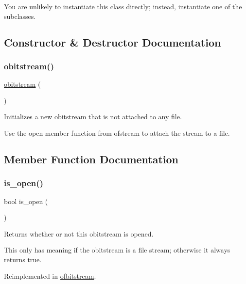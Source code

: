 You are unlikely to instantiate this class directly; instead, instantiate one of the subclasses. 

\subsection{Constructor \& Destructor Documentation}
\mbox{\label{classobitstream_affc1b0bda48ee1c09b796e92ad7f8954}} 
\subsubsection{\texorpdfstring{obitstream()}{obitstream()}}
{\footnotesize\ttfamily \mbox{\hyperlink{classobitstream}{obitstream}} (\begin{DoxyParamCaption}{ }\end{DoxyParamCaption})}



Initializes a new obitstream that is not attached to any file. 

Use the open member function from ofstream to attach the stream to a file. 

\subsection{Member Function Documentation}
\mbox{\label{classobitstream_a2f57f54d8c03b615bb31eee091d8a88a}} 
\subsubsection{\texorpdfstring{is\+\_\+open()}{is\_open()}}
{\footnotesize\ttfamily bool is\+\_\+open (\begin{DoxyParamCaption}{ }\end{DoxyParamCaption})\hspace{0.3cm}{\ttfamily [virtual]}}



Returns whether or not this obitstream is opened. 

This only has meaning if the obitstream is a file stream; otherwise it always returns true. 

Reimplemented in \mbox{\hyperlink{classofbitstream_a2f57f54d8c03b615bb31eee091d8a88a}{ofbitstream}}.

